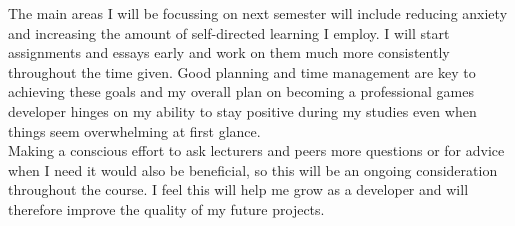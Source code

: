 \documentclass{scrartcl}
\begin{document}
The main areas I will be focussing on next semester will include reducing anxiety and increasing the amount of self-directed learning I employ. I will start assignments and essays early and work on them much more consistently throughout the time given. Good planning and time management are key to achieving these goals and my overall plan on becoming a professional games developer hinges on my ability to stay positive during my studies even when things seem overwhelming at first glance. 
\\
Making a conscious effort to ask lecturers and peers more questions or for advice when I need it would also be beneficial, so this will be an ongoing consideration throughout the course. I feel this will help me grow as a developer and will therefore improve the quality of my future projects.



\end{document}
